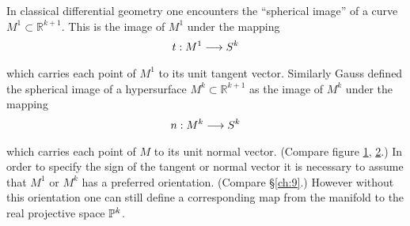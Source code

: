 \documentclass[../main]{subfiles}
\begin{document}
In classical differential geometry one encounters the ``spherical image''
of a curve $M^1\subset \mathbb R^{k+1}$. This is the image of $M^1$ under the mapping
\[t : M^1 \varrightarrow{} S^k\]
which carries each point of $M^1$ to its unit tangent vector. Similarly Gauss defined the spherical image of a hypersurface $M^k \subset \mathbb R^{k+1}$ as the image of $M^k$ under the mapping
\[n : M^k \varrightarrow{} S^k\]
which carries each point of $M$ to its unit normal vector. (Compare figure \ref{fig:figure7}, \ref{fig:figure8}.) In order to specify the sign of the tangent or normal vector it is
necessary to assume that $M^1$ or $M^k$ has a preferred orientation. (Compare
\S\ref{ch:9}.) However without this orientation one can still define a corresponding
map from the manifold to the real projective space $\mathbb{P}^k$.

\begin{figure}[ht]
    \centering
    \caption{}
    \label{fig:figure7}
\end{figure}
\begin{figure}[ht]
    \centering
    \caption{}
    \label{fig:figure8}
\end{figure}
\end{document}
